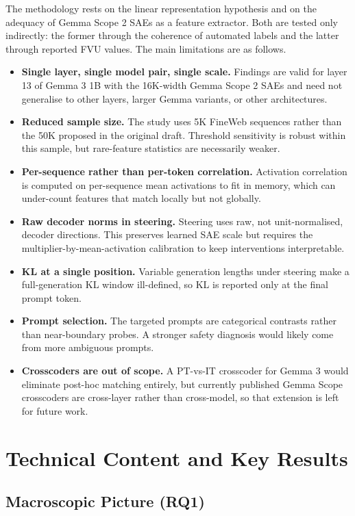 The methodology rests on the linear representation hypothesis and on the adequacy of Gemma Scope 2 SAEs as a feature extractor. Both are tested only indirectly: the former through the coherence of automated labels and the latter through reported FVU values. The main limitations are as follows.

\begin{itemize}
    \item \textbf{Single layer, single model pair, single scale.} Findings are valid for layer 13 of Gemma 3 1B with the 16K-width Gemma Scope 2 SAEs and need not generalise to other layers, larger Gemma variants, or other architectures.
    \item \textbf{Reduced sample size.} The study uses 5K FineWeb sequences rather than the 50K proposed in the original draft. Threshold sensitivity is robust within this sample, but rare-feature statistics are necessarily weaker.
    \item \textbf{Per-sequence rather than per-token correlation.} Activation correlation is computed on per-sequence mean activations to fit in memory, which can under-count features that match locally but not globally.
    \item \textbf{Raw decoder norms in steering.} Steering uses raw, not unit-normalised, decoder directions. This preserves learned SAE scale but requires the multiplier-by-mean-activation calibration to keep interventions interpretable.
    \item \textbf{KL at a single position.} Variable generation lengths under steering make a full-generation KL window ill-defined, so KL is reported only at the final prompt token.
    \item \textbf{Prompt selection.} The targeted prompts are categorical contrasts rather than near-boundary probes. A stronger safety diagnosis would likely come from more ambiguous prompts.
    \item \textbf{Crosscoders are out of scope.} A PT-vs-IT crosscoder for Gemma 3 would eliminate post-hoc matching entirely, but currently published Gemma Scope crosscoders are cross-layer rather than cross-model, so that extension is left for future work.
\end{itemize}

\section{Technical Content and Key Results}
\label{sec:results}

\subsection{Macroscopic Picture (RQ1)}
\label{subsec:rq1-results}

